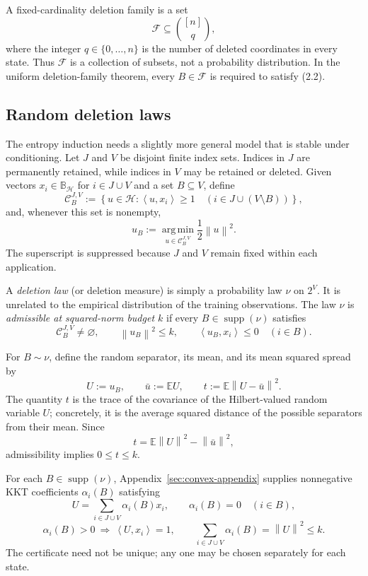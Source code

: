 \documentclass[11pt]{article}
\theoremstyle{definition}
\theoremstyle{remark}
\newcommand{\Hh}{\mathcal H}
\newcommand{\E}{\mathbb E}
\newcommand{\ip}[2]{\left\langle #1,#2\right\rangle}
\newcommand{\norm}[1]{\left\lVert #1\right\rVert}
\newcommand{\argminop}{\operatorname*{arg\,min}}
\newcommand{\supp}{\operatorname{supp}}
\begin{document}
A fixed-cardinality deletion family is a set
\[
 \mathcal F\subseteq\binom{[n]}q,
\]
where the integer \(q\in\{0,\ldots,n\}\) is the number of deleted
coordinates in every state. Thus \(\mathcal F\) is a collection of subsets,
not a probability distribution. In the uniform deletion-family theorem,
every \(B\in\mathcal F\) is required to satisfy (2.2).

\subsection{Random deletion laws}

The entropy induction needs a slightly more general model that is stable
under conditioning. Let \(J\) and \(V\) be disjoint finite index sets.
Indices in \(J\) are permanently retained, while indices in \(V\) may be
retained or deleted. Given vectors \(x_i\in\mathbb B_{\Hh}\) for
\(i\in J\cup V\) and a set \(B\subseteq V\), define
\[
 \mathcal C_B^{J,V}
 :=
 \left\{
   u\in\Hh:
   \ip{u}{x_i}\ge1
   \quad(i\in J\cup(V\setminus B))
 \right\},
\]
and, whenever this set is nonempty,
\[
 u_B:=\argminop_{u\in\mathcal C_B^{J,V}}\frac12\norm u^2.
\]
The superscript is suppressed because \(J\) and \(V\) remain fixed within
each application.

A \emph{deletion law} (or deletion measure) is simply a probability law
\(\nu\) on \(2^V\). It is unrelated to the empirical distribution of the
training observations. The law \(\nu\) is \emph{admissible at squared-norm
budget \(k\)} if every \(B\in\supp(\nu)\) satisfies
\[
 \mathcal C_B^{J,V}\ne\varnothing,
 \qquad
 \norm{u_B}^2\le k,
 \qquad
 \ip{u_B}{x_i}\le0\quad(i\in B).
 \tag{2.3}
\]

For \(B\sim\nu\), define the random separator, its mean, and its mean squared
spread by
\[
 U:=u_B,
 \qquad
 \bar u:=\E U,
 \qquad
 t:=\E\norm{U-\bar u}^2.
 \tag{2.4}
\]
The quantity \(t\) is the trace of the covariance of the Hilbert-valued
random variable \(U\); concretely, it is the average squared distance of the
possible separators from their mean. Since
\[
 t=\E\norm U^2-\norm{\bar u}^2,
\]
admissibility implies \(0\le t\le k\).

For each \(B\in\supp(\nu)\), Appendix~\ref{sec:convex-appendix} supplies
nonnegative KKT coefficients \(\alpha_i(B)\) satisfying
\[
 U=\sum_{i\in J\cup V}\alpha_i(B)x_i,
 \qquad
 \alpha_i(B)=0\quad(i\in B),
 \tag{2.5}
\]
\[
 \alpha_i(B)>0
 \ \Longrightarrow\
 \ip{U}{x_i}=1,
 \qquad
 \sum_{i\in J\cup V}\alpha_i(B)=\norm U^2\le k.
 \tag{2.6}
\]
The certificate need not be unique; any one may be chosen separately for
each state.
\end{document}
